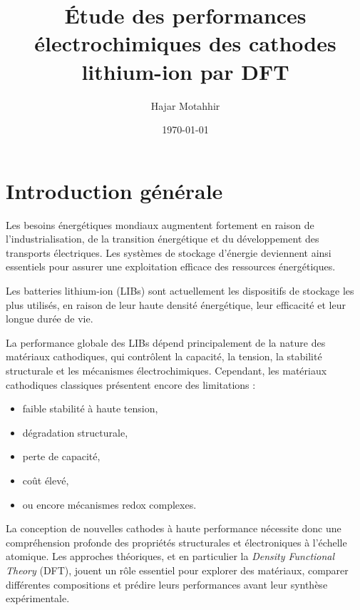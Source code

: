 \documentclass[12pt,a4paper]{report}
\begin{document}
\title{Étude des performances électrochimiques des cathodes lithium-ion par DFT}
\author{Hajar Motahhir}
\date{\today}

\maketitle

\tableofcontents


\chapter{Introduction générale}
\label{ch:introduction}


Les besoins énergétiques mondiaux augmentent fortement en raison de l’industrialisation,
de la transition énergétique et du développement des transports électriques.
Les systèmes de stockage d’énergie deviennent ainsi essentiels pour assurer
une exploitation efficace des ressources énergétiques.

Les batteries lithium-ion (LIBs) sont actuellement les dispositifs de stockage les plus utilisés,
en raison de leur haute densité énergétique, leur efficacité et leur longue durée de vie.

La performance globale des LIBs dépend principalement de la nature des matériaux cathodiques,
qui contrôlent la capacité, la tension, la stabilité structurale et les mécanismes électrochimiques.
Cependant, les matériaux cathodiques classiques présentent encore des limitations :
\begin{itemize}
    \item faible stabilité à haute tension,
    \item dégradation structurale,
    \item perte de capacité,
    \item coût élevé,
    \item ou encore mécanismes redox complexes.
\end{itemize}

La conception de nouvelles cathodes à haute performance nécessite donc une compréhension profonde
des propriétés structurales et électroniques à l’échelle atomique.
Les approches théoriques, et en particulier la \emph{Density Functional Theory} (DFT),
jouent un rôle essentiel pour explorer des matériaux,
comparer différentes compositions et prédire leurs performances avant leur synthèse expérimentale.
\end{document}
